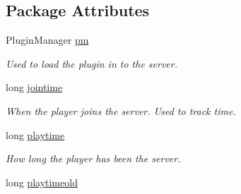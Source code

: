 \subsection*{\-Package \-Attributes}
\begin{DoxyCompactItemize}
\item 
\hypertarget{classcom_1_1github_1_1zephyrz4_1_1antiaddict_1_1antiaddict_a32a8ef07b632945cc7c04bef2627a16a}{\-Plugin\-Manager \hyperlink{classcom_1_1github_1_1zephyrz4_1_1antiaddict_1_1antiaddict_a32a8ef07b632945cc7c04bef2627a16a}{pm}}\label{classcom_1_1github_1_1zephyrz4_1_1antiaddict_1_1antiaddict_a32a8ef07b632945cc7c04bef2627a16a}

\begin{DoxyCompactList}\small\item\em \-Used to load the plugin in to the server. \end{DoxyCompactList}\item 
\hypertarget{classcom_1_1github_1_1zephyrz4_1_1antiaddict_1_1antiaddict_a9b6221dca7e7dc95795a039af9c98094}{long \hyperlink{classcom_1_1github_1_1zephyrz4_1_1antiaddict_1_1antiaddict_a9b6221dca7e7dc95795a039af9c98094}{jointime}}\label{classcom_1_1github_1_1zephyrz4_1_1antiaddict_1_1antiaddict_a9b6221dca7e7dc95795a039af9c98094}

\begin{DoxyCompactList}\small\item\em \-When the player joins the server. \-Used to track time. \end{DoxyCompactList}\item 
\hypertarget{classcom_1_1github_1_1zephyrz4_1_1antiaddict_1_1antiaddict_a865e26f58a1ddbbed861d5dedf49452f}{long \hyperlink{classcom_1_1github_1_1zephyrz4_1_1antiaddict_1_1antiaddict_a865e26f58a1ddbbed861d5dedf49452f}{playtime}}\label{classcom_1_1github_1_1zephyrz4_1_1antiaddict_1_1antiaddict_a865e26f58a1ddbbed861d5dedf49452f}

\begin{DoxyCompactList}\small\item\em \-How long the player has been the server. \end{DoxyCompactList}\item 
\hypertarget{classcom_1_1github_1_1zephyrz4_1_1antiaddict_1_1antiaddict_af6b3e4c94d7a5df41a7e0c5309549bcb}{long \hyperlink{classcom_1_1github_1_1zephyrz4_1_1antiaddict_1_1antiaddict_af6b3e4c94d7a5df41a7e0c5309549bcb}{playtimeold}}\label{classcom_1_1github_1_1zephyrz4_1_1antiaddict_1_1antiaddict_af6b3e4c94d7a5df41a7e0c5309549bcb}


\end{DoxyCompactItemize}
